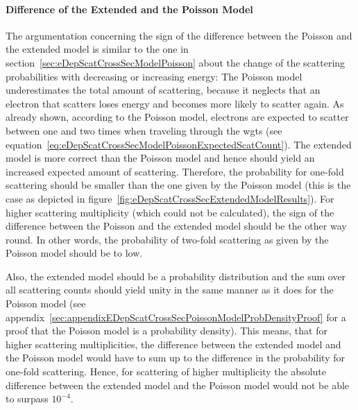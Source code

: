 \paragraph{Difference of the Extended and the Poisson Model}
The argumentation concerning the sign of the difference between the Poisson and the extended model is similar to the one in section~\ref{sec:eDepScatCrossSecModelPoisson} about the change of the scattering probabilities with decreasing or increasing energy: The Poisson model underestimates the total amount of scattering, because it neglects that an electron that scatters loses energy and becomes more likely to scatter again. As already shown, according to the Poisson model, electrons are expected to scatter between one and two times when traveling through the \gls{wgts} (see equation~\ref{eq:eDepScatCrossSecModelPoissonExpectedScatCount}). The extended model is more correct than the Poisson model and hence should yield an increased expected amount of scattering. Therefore, the probability for one-fold scattering should be smaller than the one given by the Poisson model (this is the case as depicted in figure~\ref{fig:eDepScatCrossSecExtendedModelResults}). For higher scattering multiplicity (which could not be calculated), the sign of the difference between the Poisson and the extended model should be the other way round. In other words, the probability of two-fold scattering as given by the Poisson model should be to low.

Also, the extended model should be a probability distribution and the sum over all scattering counts should yield unity in the same manner as it does for the Poisson model (see appendix~\ref{sec:appendixEDepScatCrossSecPoissonModelProbDensityProof} for a proof that the Poisson model is a probability density). This means, that for higher scattering multiplicities, the difference between the extended model and the Poisson model would have to sum up to the difference in the probability for one-fold scattering. Hence, for scattering of higher multiplicity the absolute difference between the extended model and the Poisson model would not be able to surpass $10^{-4}$.

